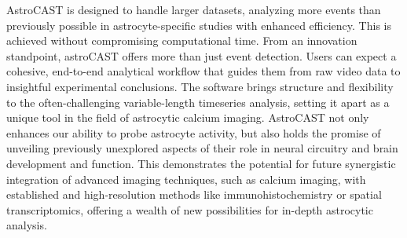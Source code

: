 AstroCAST is designed to handle larger datasets, analyzing more events than previously possible in astrocyte-specific studies with enhanced efficiency. This is achieved without compromising computational time. From an innovation standpoint, astroCAST offers more than just event detection. Users can expect a cohesive, end-to-end analytical workflow that guides them from raw video data to insightful experimental conclusions. The software brings structure and flexibility to the often-challenging variable-length timeseries analysis, setting it apart as a unique tool in the field of astrocytic calcium imaging. AstroCAST not only enhances our ability to probe astrocyte activity, but also holds the promise of unveiling previously unexplored aspects of their role in neural circuitry and brain development and function. This demonstrates the potential for future synergistic integration of advanced imaging techniques, such as calcium imaging, with established and high-resolution methods like immunohistochemistry or spatial transcriptomics, offering a wealth of new possibilities for in-depth astrocytic analysis.